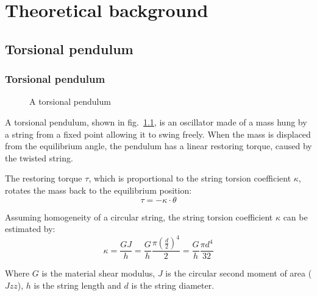 \documentclass[\main/master.tex]{subfiles}
\begin{document}
\chapter{Theoretical background}\label{chapter:Theoretical background}
\section{Torsional pendulum}
\subsection{Torsional pendulum}
\begin{figure}[htbp]
	\centering
	\caption[Torsional pendulum]{A torsional pendulum}
	\label{fig:torsion_pendulum}
\end{figure}
\par\noindent
A torsional pendulum, shown in fig.~\ref{fig:torsion_pendulum}, is an oscillator made of a mass hung by a string from a fixed point allowing it to swing freely. When the mass is displaced from the equilibrium angle, the pendulum has a linear restoring torque, caused by the twisted string. 
\par\noindent
The restoring torque $\tau$, which is proportional to the string torsion coefficient $\kappa$, rotates the mass back to the equilibrium position:
\begin{equation}
\tau = -\kappa\cdot\theta     \label{eqn:hook law}
\end{equation}
\par\noindent
Assuming homogeneity of a circular string, the string torsion coefficient $\kappa$ can be estimated by:
\begin{equation}
\kappa = \frac{GJ}{h} = \frac{G}{h} \frac{\pi(\frac{d}{2})^4}{2}  = \frac{G}{h} \frac{\pi d^4}{32}   \label{eqn:torsion_coefficient_homogeneity}
\end{equation}
\par\noindent
Where $G$ is the material shear modulus, $J$ is the circular second moment of area ($Jzz$), $h$ is the string length and $d$ is the string diameter.
\end{document}
